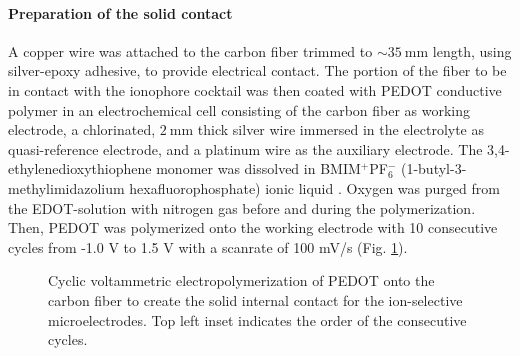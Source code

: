 				\paragraph{Preparation of the solid contact}
A copper wire was attached to the carbon fiber trimmed to $\sim35~$mm length, using silver-epoxy adhesive, to provide electrical contact.
The portion of the fiber to be in contact with the ionophore cocktail was then coated with PEDOT conductive polymer in an electrochemical cell consisting of the carbon fiber as working electrode, a chlorinated, $2~$mm thick silver wire immersed in the electrolyte as quasi-reference electrode, and a platinum wire as the auxiliary electrode.
The 3,4-ethylenedioxythiophene monomer was dissolved in BMIM$^+$PF$_6^-$ (1-butyl-3-methylimidazolium hexafluorophosphate) ionic liquid \cite{gyetvai2007solid}.
Oxygen was purged from the EDOT-solution with nitrogen gas before and during the polymerization.
Then, PEDOT was polymerized onto the working electrode with 10 consecutive cycles from -1.0 V to 1.5 V with a scanrate of 100 mV/s (Fig. \ref{fig:polymerization}).

\begin{figure}
\centering
{}
\caption[Cyclic voltammetric electropolymerization of PEDOT onto the carbon fiber to create the solid internal contact for the ion-selective microelectrodes.]{Cyclic voltammetric electropolymerization of PEDOT onto the carbon fiber to create the solid internal contact for the ion-selective microelectrodes.
Top left inset indicates the order of the consecutive cycles.}
\label{fig:polymerization}
\end{figure}

